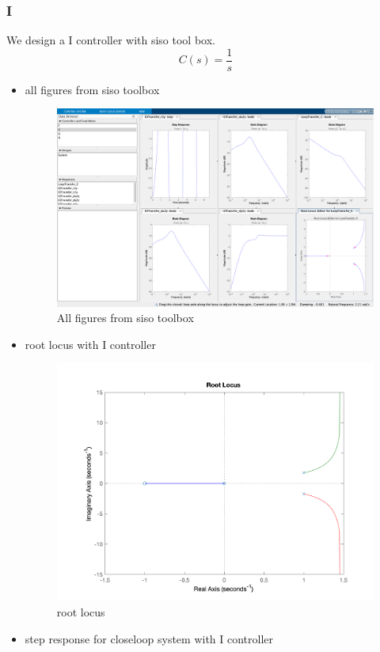 \subsubsection{I}
We design a I controller with siso tool box.
$$
C(s) = \dfrac{1}{s}
$$
\begin{itemize}
	\item all figures from siso toolbox
	\begin{figure}[H]
		\caption{All figures from siso toolbox}
		\centering
		\includegraphics[width=16cm]{../Figure/Q1/Q1_b/I/siso_all.png}
	\end{figure}
	\newpage
	\item root locus with I controller
	\begin{figure}[H]
		\caption{root locus}
		\centering
		\includegraphics[width=12cm]{../Figure/Q1/Q1_b/I/rlocus.png}
	\end{figure}
	\item step response for closeloop system with I controller

\end{itemize}
